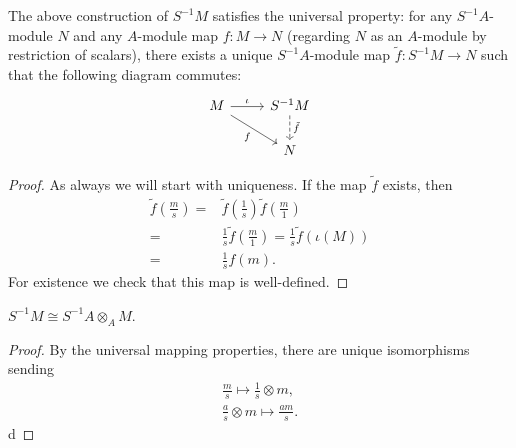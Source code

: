 \documentclass[12pt]{article}
\begin{document}
\begin{proposition}
	The above construction of $S^{-1}M$ satisfies the universal property: for any $S^{-1}A$-module $N$ and any $A$-module map $f:M\to N$ (regarding $N$ as an $A$-module by restriction of scalars), there exists a unique $S^{-1}A$-module map $\tilde{f}:S^{-1}M\to N$ such that the following diagram commutes:
	\begin{equation*}
\begin{tikzcd}
M \arrow[r, "\iota"] \arrow[rd, "f"'] & S^{-1}M \arrow[d, "\tilde{f}", dashed] \\
                                      & N                                     
\end{tikzcd}
	\end{equation*}
\end{proposition}
\begin{proof}
	As always we will start with uniqueness. If the map $\tilde{f}$ exists, then 
	\begin{align*}
		\tilde{f}(\frac{m}{s}) 
		=& \tilde{f}(\frac{1}{s})\tilde{f}(\frac{m}{1}) \\
		=& \frac{1}{s}\tilde{f}(\frac{m}{1}) = \frac{1}{s}\tilde{f}(\iota(M)) \\
		=& \frac{1}{s}f(m).
	\end{align*}
	For existence we check that this map is well-defined. 
\end{proof}

\begin{corollary}
	$S^{-1}M \cong S^{-1}A\otimes_A M$.
\end{corollary}
\begin{proof}
	By the universal mapping properties, there are unique isomorphisms sending 
	\begin{gather*}
		\frac{m}{s} \mapsto \frac{1}{s}\otimes m, \\
		\frac{a}{s}\otimes m \mapsto \frac{am}{s}.
	\end{gather*}
	d 
\end{proof}
\end{document}
